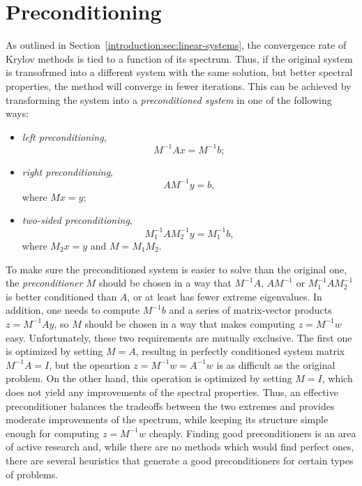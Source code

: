 \section{Preconditioning}

As outlined in Section~\ref{introduction:sec:linear-systems}, the convergence
rate of Krylov methods is tied to a function of its spectrum. Thus, if the
original system is transofrmed into a different system with the same solution,
but better spectral properties, the method will converge in fewer iterations.
This can be achieved by transforming the system into a \emph{preconditioned
system} in one of the following ways:
\begin{itemize}
\item \emph{left preconditioning},
\begin{equation}
    M^{-1}Ax = M^{-1}b;
\end{equation}
\item \emph{right preconditioning},
\begin{equation}
    AM^{-1}y = b,
\end{equation}
where $Mx = y$;
\item \emph{two-sided preconditioning},
\begin{equation}
    M_1^{-1}AM_2^{-1} y = M_1^{-1}b,
\end{equation}
where $M_2x = y$ and $M = M_1 M_2$.
\end{itemize}

To make sure the preconditioned system is easier to solve than the original one,
the \emph{preconditioner} $M$ should be chosen in a way that $M^{-1}A$,
$AM^{-1}$ or $M_1^{-1}AM_2^{-1}$ is better conditioned than $A$, or at least has
fewer extreme eigenvalues. In addition, one needs to compute $M^{-1}b$ and a
series of matrix-vector products $z = M^{-1}Ay$, so $M$ should be chosen in a
way that makes computing $z = M^{-1}w$ easy. Unfortunately, these two
requirements are mutually exclusive. The first one is optimized by setting
$M = A$, resultng in perfectly conditioned system matrix $M^{-1}A = I$, but
the opeartion $z = M^{-1}w = A^{-1}w$ is as difficult as the original problem.
On the other hand, this operation is optimized by setting $M = I$, which does
not yield any improvements of the spectral properties. Thus, an effective
preconditioner balances the tradeoffs between the two extremes and provides
moderate improvements of the spectrum, while keeping its structure simple enough
for computing $z = M^{-1}w$ cheaply. Finding good preconditioners is an area of
active research and, while there are no methods which would find perfect ones,
there are several heuristics that generate a good preconditioners for certain
types of problems.

